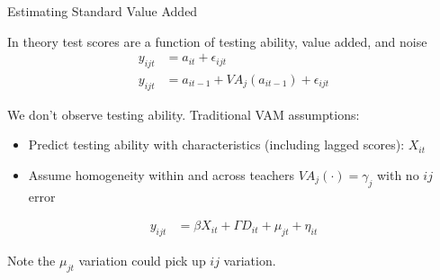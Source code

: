 \documentclass[11pt]{beamer}
\newenvironment{wideitemize}{\itemize\addtolength{\itemsep}{14pt}}{\enditemize}
\begin{document}
\begin{frame}{Estimating Standard  Value Added}

\begin{wideitemize}
    \item In theory test scores are a function of testing ability, value added, and noise
    \begin{align*}
    y_{ijt}  &= a_{it} + \epsilon_{ijt} \\
    y_{ijt}  &= a_{it-1} + VA_j(a_{it-1}) + \epsilon_{ijt}
    \end{align*}
 
    \item We don't observe testing ability. Traditional VAM assumptions:
    \begin{itemize}
        \item Predict testing ability with characteristics (including lagged scores): $X_{it}$
        \item Assume homogeneity within and across teachers $VA_j(\cdot)=\gamma_j$ with no $ij$ error
    \end{itemize}
    \begin{align*}
    y_{ijt}  &= \beta X_{it} +\Gamma D_{it} +\mu_{jt} + \eta_{it}
    \end{align*}
    
    \item Note the $\mu_{jt}$ variation could pick up $ij$ variation.
       
    
\end{wideitemize}
\end{frame}


\end{document}

